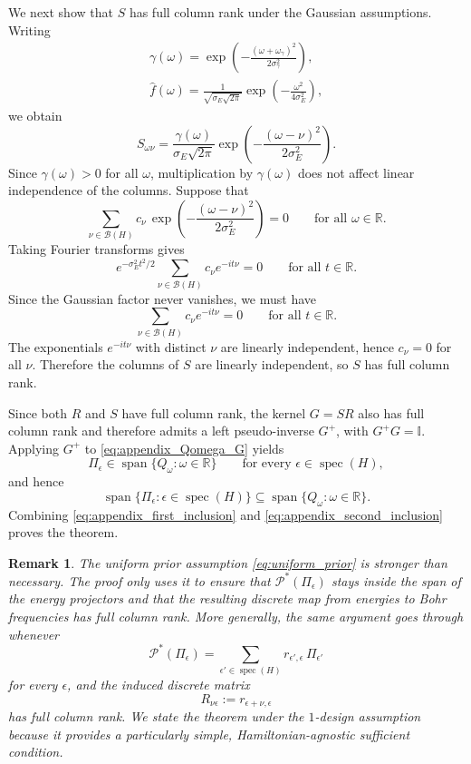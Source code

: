 \documentclass[showpacs,amsmath,amssymb,twocolumn,prx,superscriptaddress,10pt,aps,nofootinbib]{revtex4-2}
\newcommand{\vspan}{\operatorname{span}}
\newtheorem{remark}[theorem]{Remark}
\begin{document}
We next show that \(S\) has full column rank under the Gaussian assumptions. Writing
\begin{align}
    \gamma(\omega)=\exp\!\left(-\frac{(\omega+\omega_\gamma)^2}{2\sigma_\gamma^2}\right), \\
    \hat f(\omega)=\frac{1}{\sqrt{\sigma_E\sqrt{2\pi}}}
    \exp\!\left(-\frac{\omega^2}{4\sigma_E^2}\right),
\end{align}
we obtain
\begin{equation}
\label{eq:appendix_S_gaussian}
    S_{\omega\nu}
    =
    \frac{\gamma(\omega)}{\sigma_E\sqrt{2\pi}}
    \exp\!\left(-\frac{(\omega-\nu)^2}{2\sigma_E^2}\right).
\end{equation}
Since \(\gamma(\omega)>0\) for all \(\omega\), multiplication by \(\gamma(\omega)\) does not affect linear independence of the columns. Suppose that
\[
\sum_{\nu\in\mathcal B(H)} c_{\nu}\,
\exp\!\left(-\frac{(\omega-\nu)^2}{2\sigma_E^2}\right)=0
\qquad
\text{for all }\omega\in\mathbb R.
\]
Taking Fourier transforms gives
\[
e^{-\sigma_E^2 t^2/2}
\sum_{\nu\in\mathcal B(H)} c_{\nu} e^{-it\nu}=0
\qquad
\text{for all }t\in\mathbb R.
\]
Since the Gaussian factor never vanishes, we must have
\[
\sum_{\nu\in\mathcal B(H)} c_{\nu} e^{-it\nu}=0
\qquad
\text{for all }t\in\mathbb R.
\]
The exponentials \(e^{-it\nu}\) with distinct \(\nu\) are linearly independent, hence \(c_{\nu}=0\) for all \(\nu\). Therefore the columns of \(S\) are linearly independent, so \(S\) has full column rank.

Since both \(R\) and \(S\) have full column rank, the kernel \(G=SR\) also has full column rank and therefore admits a left pseudo-inverse \(G^+\), with $G^+G=\mathbb{I}$. Applying \(G^+\) to \eqref{eq:appendix_Qomega_G} yields
\[
\Pi_{\epsilon}\in \vspan\{Q_{\omega}:\omega\in\mathbb R\}
\qquad
\text{for every }\epsilon\in\operatorname{spec}(H),
\]
and hence
\begin{equation}
\label{eq:appendix_second_inclusion}
    \vspan\{\Pi_{\epsilon}:\epsilon\in\operatorname{spec}(H)\}
    \subseteq
    \vspan\{Q_{\omega}:\omega\in\mathbb R\}.
\end{equation}
Combining \eqref{eq:appendix_first_inclusion} and \eqref{eq:appendix_second_inclusion} proves the theorem.

\begin{remark}
The uniform prior assumption \eqref{eq:uniform_prior} is stronger than necessary. The proof only uses it to ensure that \(\mathcal P^*(\Pi_{\epsilon})\) stays inside the span of the energy projectors and that the resulting discrete map from energies to Bohr frequencies has full column rank. More generally, the same argument goes through whenever
\[
\mathcal P^*(\Pi_{\epsilon})
=
\sum_{\epsilon'\in\operatorname{spec}(H)}
r_{\epsilon',\epsilon}\,\Pi_{\epsilon'}
\]
for every \(\epsilon\), and the induced discrete matrix
\[
R_{\nu\epsilon}:=r_{\epsilon+\nu,\epsilon}
\]
has full column rank. We state the theorem under the \(1\)-design assumption because it provides a particularly simple, Hamiltonian-agnostic sufficient condition.
\end{remark}
\end{document}
